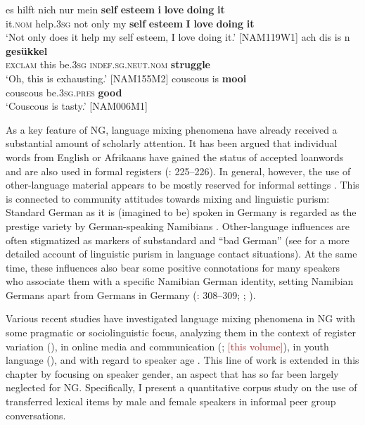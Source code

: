 \documentclass[output=paper]{langsci/langscibook}
\begin{document}
\ea 
\label{ex:bracke:1}
	\gll es hilft nich nur mein \textbf{self} \textbf{esteem} \textbf{i} \textbf{love} \textbf{doing} \textbf{it}\\
     it.\textsc{nom} help.3\textsc{sg} not only my \textbf{self} \textbf{esteem} \textbf{I} \textbf{love} \textbf{doing} \textbf{it}\\
	\glt `Not only does it help my self esteem, I love doing it.' {[}NAM119W1{]}
\ex
\label{ex:bracke:2}
\gll ach dis is n \textbf{gesükkel}\\
     \textsc{exclam} this be.\textsc{3sg} \textsc{indef.sg.neut.nom} \textbf{struggle}\\
\glt `Oh, this is exhausting.'  {[}NAM155M2{]}
\ex 
\label{ex:bracke:3}
\gll couscous is \textbf{mooi}\\
     couscous be.\textsc{3sg.pres} \textbf{good}\\
\glt `Couscous is tasty.' {[}NAM006M1{]}
\z

As a key feature of NG, language mixing phenomena have already received a substantial amount of scholarly attention. It has been argued that individual words from English or Afrikaans have gained the status of accepted loanwords and are also used in formal registers (\citealt{kellermeier-rehbein_sprache_2016}: 225--226). In general, however, the use of other-language material appears to be mostly reserved for informal settings \citep{wiese_registerdifferenzierung_2021}. This is connected to community attitudes towards mixing and linguistic purism: Standard German as it is (imagined to be) spoken in Germany is regarded as the prestige variety by German-speaking Namibians \citep[1185]{zimmer_deutsch_2019}. Other-language influences are often stigmatized as markers of substandard and “bad German” (see  for a more detailed account of linguistic purism in language contact situations). At the same time, these influences also bear some positive connotations for many speakers who associate them with a specific Namibian German identity, setting Namibian Germans apart from Germans in Germany (\citealt{schmidt-lauber_verkehrte_1998}: 308--309; \citealt{wiese_registerdifferenzierung_2021}; ).

Various recent studies have investigated language mixing phenomena in NG with some pragmatic or sociolinguistic focus, analyzing them in the context of register variation (\citealt{wiese_registerdifferenzierung_2021}), in online media and communication (\citealt{radke_lekker_2017}; \citeyear{chapters/06_Radke} \textcolor{brown}{[this volume]}), in youth language (\citealt{kellermeier-rehbein_namslang_2015, kellermeier-rehbein_sprache_2016}), and with regard to speaker age \citep{zimmer_linguisticvar_toappear}. This line of work is extended in this chapter by focusing on speaker gender, an aspect that has so far been largely neglected for NG. Specifically, I present a quantitative corpus study on the use of transferred lexical items by male and female speakers in informal peer group conversations.
\end{document}

